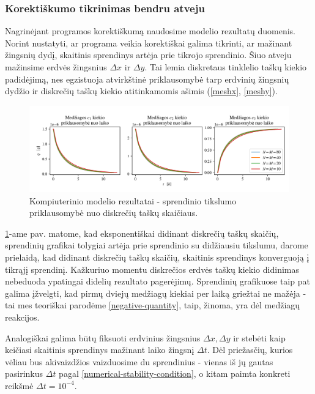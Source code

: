 \subsubsection*{Korektiškumo tikrinimas bendru atveju}

Nagrinėjant programos korektiškumą naudosime modelio rezultatų duomenis. 
Norint nustatyti, ar programa veikia korektiškai galima tikrinti, ar mažinant žingsnių dydį, skaitinis sprendinys artėja prie tikrojo sprendinio. Šiuo atveju mažinsime erdvės žingsnius $\Delta x$ ir $\Delta y$. Tai lemia diskretaus tinklelio taškų kiekio padidėjimą, nes egzistuoja atvirkštinė priklausomybė tarp erdvinių žingsnių dydžio ir diskrečių taškų kiekio atitinkamomis ašimis (\ref{meshx}, \ref{meshy}).

\newpage

\begin{figure}[h!]
    \centering
    \includegraphics[width=\textwidth]{../assets/space-error-1.png}

    \caption{Kompiuterinio modelio rezultatai - sprendinio tikslumo priklausomybė nuo diskrečių taškų skaičiaus. }

    \label{results-space-error}
\end{figure}

\ref{results-space-error}-ame pav. matome, kad eksponentiškai didinant diskrečių taškų skaičių, sprendinių grafikai tolygiai artėja prie sprendinio su didžiausiu tikslumu, darome prielaidą, kad didinant diskrečių taškų skaičių, skaitinis sprendinys konverguoją į tikrąjį sprendinį. Kažkuriuo momentu diskrečios erdvės taškų kiekio didinimas nebeduoda ypatingai didelių rezultato pagerėjimų. Sprendinių grafikuose taip pat galima įžvelgti, kad pirmų dviejų medžiagų kiekiai per laiką griežtai ne mažėja - tai mes teoriškai parodėme \eqref{negative-quantity}, taip, žinoma, yra dėl  medžiagų reakcijos. 

Analogiškai galima būtų fiksuoti erdvinius žingsnius $\Delta x, \Delta y$ ir stebėti kaip keičiasi skaitinis sprendinys mažinant laiko žingsnį $\Delta t$. Dėl priežasčių, kurios vėliau bus akivaizdžios vaizduosime du sprendinius - vienas iš jų gautas pasirinkus $\Delta t$ pagal \eqref{numerical-stability-condition}, o kitam paimta konkreti reikšmė $\Delta t = 10^{-4}$.


